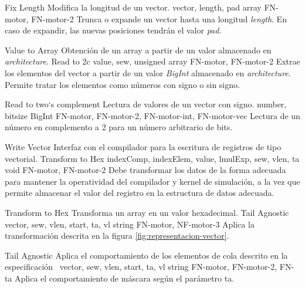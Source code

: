 \begin{component}{Fix Length} %
{Modifica la longitud de un vector.}
{\NA}
{vector, length, pad}
{array}
{FN-motor, FN-motor-2}
Trunca o expande un vector hasta una longitud \textit{length}. En caso de expandir, las nuevas posiciones tendrán el valor \textit{pad}.
\end{component}

\begin{component}{Value to Array} %
{Obtención de un array a partir de un valor almacenado en \textit{architecture}.}
{Read to 2c}
{value, sew, unsigned}
{array}
{FN-motor, FN-motor-2}
Extrae los elementos del vector a partir de un valor \textit{BigInt} almacenado en \textit{architecture}. Permite tratar los elementos como números con signo o sin signo.
\end{component}

\begin{component}{Read to two`s complement} %
{Lectura de valores de un vector con signo.}
{\NA}
{number, bitsize}
{BigInt}
{FN-motor, FN-motor-2, FN-motor-int, FN-motor-vec}
Lectura de un número en complemento a 2 para un número arbitrario de bits.
\end{component}

\begin{component}{Write Vector} %
{Interfaz con el compilador para la escritura de registros de tipo vectorial.}
{Transform to Hex}
{indexComp, indexElem, value, lmulExp, sew, vlen, ta}
{void}
{FN-motor, FN-motor-2}
Debe transformar los datos de la forma adecuada para mantener la operatividad del compilador y kernel de simulación, a la vez que permite almacenar el valor del registro en la estructura de datos adecuada.
\end{component}

\begin{component}{Transform to Hex} %
{Transforma un array en un valor hexadecimal.}
{Tail Agnostic}
{vector, sew, vlen, start, ta, vl}
{string}
{FN-motor, NF-motor-3}
Aplica la transformación descrita en la figura \ref{fig:representacion-vector}.
\end{component}

\begin{component}{Tail Agnostic} %
{Aplica el comportamiento de los elementos de cola descrito en la especificación~\cite{riscv-isa2024}}
{\NA}
{vector, sew, vlen, start, ta, vl}
{string}
{FN-motor, FN-motor-2, FN-ta}
Aplica el comportamiento de máscara según el parámetro ta.
\end{component}

